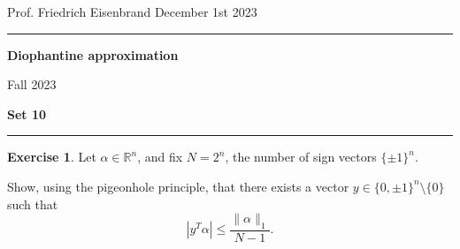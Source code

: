 \documentclass[12pt,a4paper]{article}
\date{}
\theoremstyle{plain}
\newtheorem*{Sol*}{Solution}
\theoremstyle{definition}
\newtheorem{Ex}{Exercise}
\def \R {\mathbb R}
\newif\ifsolutions
\newcommand{\exercise}[2]{
			\begin{Ex} #1 \end{Ex}
			\ifsolutions  \begin{Sol*} #2 \end{Sol*} \bigskip \else \bigskip  \fi
		}
\begin{document}
\begin{center}
{Prof. Friedrich Eisenbrand \hfill December 1st 2023}
\end{center}
	
\hrule\vspace{\baselineskip}

\begin{center}
\textbf{Diophantine approximation}

Fall 2023

\bigskip

\textbf{Set 10}
\ifsolutions{\textbf{- Solutions}} \else{} \fi
\end{center}

\hrule\vspace{\baselineskip}




\exercise{
	Let $\alpha \in \R^n$, and fix $N=2^n$, the number of sign vectors $\{\pm1\}^n$.

	Show, using the pigeonhole principle, that there exists a vector $y \in \{ 0, \pm 1\}^n \setminus \{ 0\}$ such that
		\[ | y^T \alpha | \leq \frac{\| \alpha \|_1 }{N - 1}. \]
}{
	Consider the set of all signed sums $|s^T\alpha|$ for $s \in \{ \pm 1\}^n$.
	They all belong in the interval $\left[- \|\alpha\|_1, \| \alpha \|_1 \right]$, which we may split uniformly into $N-1$ pieces of size
		\[ \frac{2 \| \alpha \|_1}{N-1} \]
	in order to guarantee that two signed sums belong to the same interval.

	By pigeonhole, there exist $s_1 \neq s_2$ such that
		\[ | s_1^T \alpha - s_2^T \alpha| \leq \frac{2 \| \alpha \|_1}{N-1}. \]
	Denote $y = (s_1 - s_2)/2 \in \{ 0, \pm1\}^n \setminus \{ 0\}$ which concludes.



}
\end{document}
